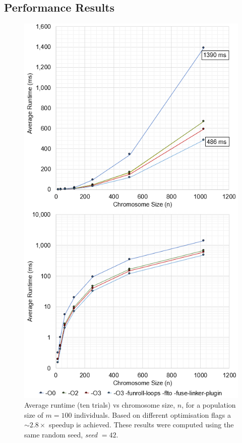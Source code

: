 \documentclass{article}
\begin{document}
\subsection{Performance Results}
\begin{figure}[H]
\centering
\includegraphics[scale=0.85]{avruntime2.png}
	\caption{Average runtime (ten trials) vs chromosome size, \(n\), for a population size of \(m=100\) individuals. Based on different optimisation flags a \(\sim 2.8\times\) speedup is achieved. These results were computed using the same random seed, \textit{seed }\(=42\).}
\end{figure}
\end{document}
